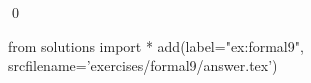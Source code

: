 
\begin{ex} 
  \label{ex:formal9}
  
  \qed
\end{ex} 
\begin{python0}
from solutions import *
add(label="ex:formal9",
    srcfilename='exercises/formal9/answer.tex') 
\end{python0}
